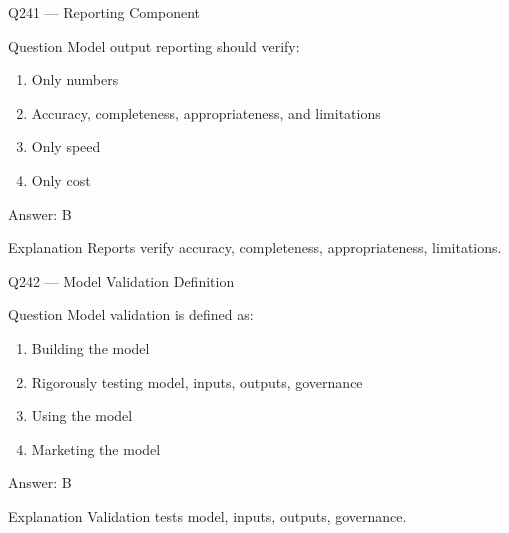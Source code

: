 \documentclass[aspectratio=169,8pt]{beamer}
\begin{document}
								\begin{frame}{Q241 --- Reporting Component}
									\begin{block}{Question}
										Model output reporting should verify:
										\begin{enumerate}
											\item Only numbers
											\item Accuracy, completeness, appropriateness, and limitations
											\item Only speed
											\item Only cost
										\end{enumerate}
									\end{block}
									\begin{exampleblock}{Answer: B}\end{exampleblock}
									\begin{block}{Explanation}
										Reports verify accuracy, completeness, appropriateness, limitations.
									\end{block}
								\end{frame}
								
								\begin{frame}{Q242 --- Model Validation Definition}
									\begin{block}{Question}
										Model validation is defined as:
										\begin{enumerate}
											\item Building the model
											\item Rigorously testing model, inputs, outputs, governance
											\item Using the model
											\item Marketing the model
										\end{enumerate}
									\end{block}
									\begin{exampleblock}{Answer: B}\end{exampleblock}
									\begin{block}{Explanation}
										Validation tests model, inputs, outputs, governance.
									\end{block}
								\end{frame}
								
\end{document}
